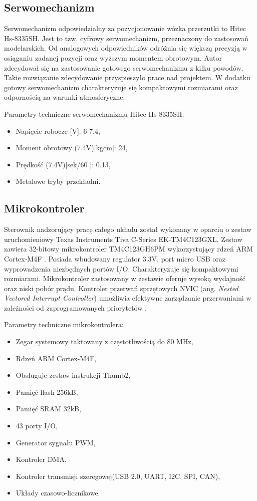 \subsection{Serwomechanizm}
Serwomechanizm odpowiedzialny za pozycjonowanie wózka przerzutki to Hitec Hs-8335SH. Jest to tzw. cyfrowy serwomechanizm, przeznaczony do zastosowań modelarskich. Od analogowych odpowiedników odróżnia się większą precyzją w osiąganiu zadanej pozycji oraz wyższym momentem obrotowym. Autor zdecydował się na zastosowanie gotowego serwomechanizmu z kilku powodów. Takie rozwiązanie zdecydowanie przyspieszyło prace nad projektem. W dodatku gotowy serwomechanizm charakteryzuje się kompaktowymi rozmiarami oraz odpornością na warunki atmosferyczne.  

Parametry techniczne serwomechanizmu Hitec Hs-8335SH:
\begin{itemize}
\item
Napięcie robocze [V]: 6-7.4,
\item
Moment obrotowy (7.4V)[kgcm]: 24,
\item
Prędkość (7.4V)[sek/$60^{\circ}$]: 0.13,
\item
Metalowe tryby przekładni.
\end{itemize} 
\label{serwo}
\subsection{Mikrokontroler}
Sterownik nadzorujący pracę całego układu został wykonany w oparciu o zestaw uruchomieniowy Texas Instruments Tiva C-Series EK-TM4C123GXL. Zestaw zawiera 32-bitowy mikrokontroler TM4C123GH6PM wykorzystujący rdzeń ARM Cortex-M4F \cite{tiva}. Posiada wbudowany regulator 3.3V, port micro USB oraz wyprowadzenia niezbędnych portów I/O. Charakteryzuje się kompaktowymi rozmiarami. Mikrokontroler zastosowany w zestawie 	oferuje wysoką wydajność oraz niski pobór prądu. Kontroler przerwań sprzętowych NVIC (ang. {\em Nested Vectored Interrupt Controller}) umożliwia efektywne zarządzanie przerwaniami w zależności od zaprogramowanych priorytetów \cite{tiva}.

Parametry techniczne mikrokontrolera:
\begin{itemize}
\item
Zegar systemowy taktowany z częstotliwością do 80 MHz,
\item
Rdzeń ARM Cortex-M4F,
\item 
Obsługuje zestaw instrukcji Thumb2,
\item
Pamięć flash 256kB,
\item
Pamięć SRAM 32kB,
\item
43 porty I/O,
\item
Generator sygnału PWM,
\item
Kontroler DMA,
\item
Kontroler transmisji szeregowej(USB 2.0, UART, I2C, SPI, CAN),
\item
Układy czasowo-licznikowe.
\end{itemize} 
